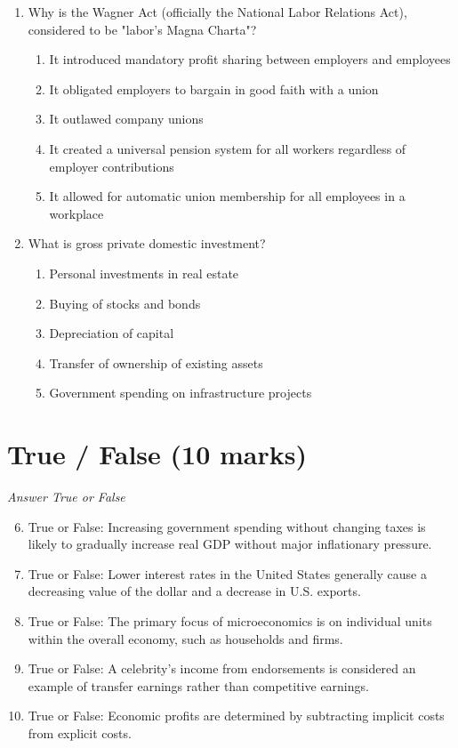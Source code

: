 \documentclass[12pt]{article}
\begin{document}
\begin{enumerate}[label=\arabic*.]
\item Why is the Wagner Act (officially the National Labor Relations Act), considered to be "labor's Magna Charta"?
\begin{enumerate}[label=(\alph*)]
    \item It introduced mandatory profit sharing between employers and employees
    \item It obligated employers to bargain in good faith with a union
    \item It outlawed company unions
    \item It created a universal pension system for all workers regardless of employer contributions
    \item It allowed for automatic union membership for all employees in a workplace
\end{enumerate}
\item What is gross private domestic investment?
\begin{enumerate}[label=(\alph*)]
    \item Personal investments in real estate
    \item Buying of stocks and bonds
    \item Depreciation of capital
    \item Transfer of ownership of existing assets
    \item Government spending on infrastructure projects
\end{enumerate}
\end{enumerate}

\section*{True / False (10 marks)}
\textit{Answer True or False}
\begin{enumerate}[label=\arabic*.]
\setcounter{enumi}{5}
\item True or False: Increasing government spending without changing taxes is likely to gradually increase real GDP without major inflationary pressure.
\item True or False: Lower interest rates in the United States generally cause a decreasing value of the dollar and a decrease in U.S. exports.
\item True or False: The primary focus of microeconomics is on individual units within the overall economy, such as households and firms.
\item True or False: A celebrity's income from endorsements is considered an example of transfer earnings rather than competitive earnings.
\item True or False: Economic profits are determined by subtracting implicit costs from explicit costs.
\end{enumerate}
\end{document}
